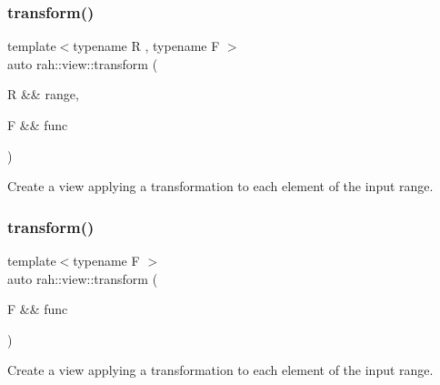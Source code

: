 \subsubsection{\texorpdfstring{transform()}{transform()}\hspace{0.1cm}{\footnotesize\ttfamily [1/2]}}
{\footnotesize\ttfamily template$<$typename R , typename F $>$ \\
auto rah\+::view\+::transform (\begin{DoxyParamCaption}\item[{R \&\&}]{range,  }\item[{F \&\&}]{func }\end{DoxyParamCaption})}



Create a view applying a transformation to each element of the input range. 


\begin{DoxyCodeInclude}{0}
\end{DoxyCodeInclude}
\mbox{\label{namespacerah_1_1view_a7c981c90e5ad03eca3ec738176feaf7d}} 
\subsubsection{\texorpdfstring{transform()}{transform()}\hspace{0.1cm}{\footnotesize\ttfamily [2/2]}}
{\footnotesize\ttfamily template$<$typename F $>$ \\
auto rah\+::view\+::transform (\begin{DoxyParamCaption}\item[{F \&\&}]{func }\end{DoxyParamCaption})}



Create a view applying a transformation to each element of the input range. 

